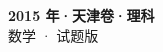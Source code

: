 \documentclass[zihao=-4, a4paper]{ctexart}
\begin{document}
\begin{center}
  {\Large\bfseries 2015 年·天津卷·理科}\\[4pt]
  {\large 数学 · 试题版}
\end{center}
\medskip
{}

\end{document}
